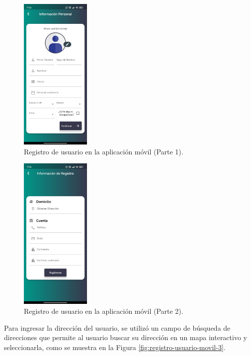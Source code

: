 \begin{figure}[H]
    \centering
    \includegraphics[width=0.3\textwidth]{chapters/III-resultados-y-discusion/resources/images/registro-usuario-movil-1.png}
    \caption{Registro de usuario en la aplicación móvil (Parte 1).}
    \label{fig:registro-usuario-movil-1}
\end{figure}

\begin{figure}[H]
    \centering
    \includegraphics[width=0.3\textwidth]{chapters/III-resultados-y-discusion/resources/images/registro-usuario-movil-2.png}
    \caption{Registro de usuario en la aplicación móvil (Parte 2).}
    \label{fig:registro-usuario-movil-2}
\end{figure}

Para ingresar la dirección del usuario, se utilizó un campo de búsqueda de direcciones que permite
al usuario buscar su dirección en un mapa interactivo y seleccionarla, como se muestra en la Figura \ref{fig:registro-usuario-movil-3}.

